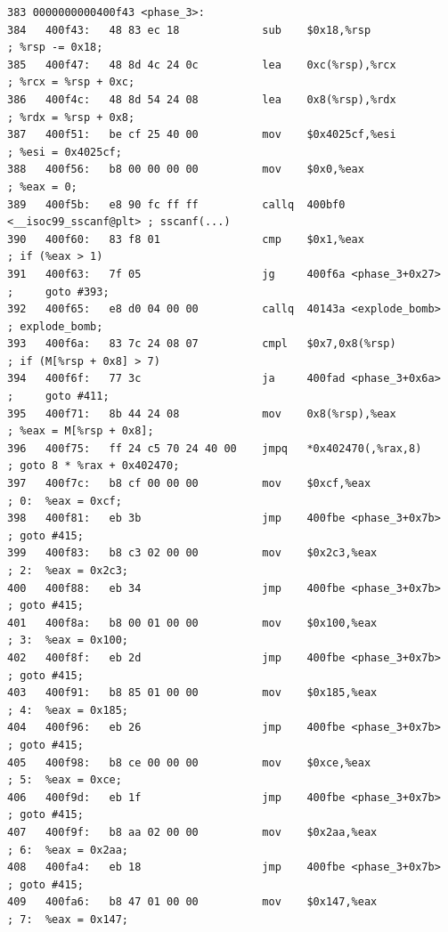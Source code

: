 \documentclass{article}
\begin{document}
\begin{lstlisting}[title = phase\_3反汇编代码及注释, xleftmargin = 2em,xrightmargin = 2em, aboveskip = 1em, numbers = none, basicstyle=\footnotesize\ttfamily]
383 0000000000400f43 <phase_3>:
384   400f43:   48 83 ec 18             sub    $0x18,%rsp                   ; %rsp -= 0x18;
385   400f47:   48 8d 4c 24 0c          lea    0xc(%rsp),%rcx               ; %rcx = %rsp + 0xc;
386   400f4c:   48 8d 54 24 08          lea    0x8(%rsp),%rdx               ; %rdx = %rsp + 0x8;
387   400f51:   be cf 25 40 00          mov    $0x4025cf,%esi               ; %esi = 0x4025cf;
388   400f56:   b8 00 00 00 00          mov    $0x0,%eax                    ; %eax = 0;
389   400f5b:   e8 90 fc ff ff          callq  400bf0 <__isoc99_sscanf@plt> ; sscanf(...)
390   400f60:   83 f8 01                cmp    $0x1,%eax                    ; if (%eax > 1)
391   400f63:   7f 05                   jg     400f6a <phase_3+0x27>        ;     goto #393;
392   400f65:   e8 d0 04 00 00          callq  40143a <explode_bomb>        ; explode_bomb;
393   400f6a:   83 7c 24 08 07          cmpl   $0x7,0x8(%rsp)               ; if (M[%rsp + 0x8] > 7)
394   400f6f:   77 3c                   ja     400fad <phase_3+0x6a>        ;     goto #411;
395   400f71:   8b 44 24 08             mov    0x8(%rsp),%eax               ; %eax = M[%rsp + 0x8];
396   400f75:   ff 24 c5 70 24 40 00    jmpq   *0x402470(,%rax,8)           ; goto 8 * %rax + 0x402470;
397   400f7c:   b8 cf 00 00 00          mov    $0xcf,%eax               ; 0:  %eax = 0xcf;
398   400f81:   eb 3b                   jmp    400fbe <phase_3+0x7b>        ; goto #415;
399   400f83:   b8 c3 02 00 00          mov    $0x2c3,%eax              ; 2:  %eax = 0x2c3;
400   400f88:   eb 34                   jmp    400fbe <phase_3+0x7b>        ; goto #415;
401   400f8a:   b8 00 01 00 00          mov    $0x100,%eax              ; 3:  %eax = 0x100;
402   400f8f:   eb 2d                   jmp    400fbe <phase_3+0x7b>        ; goto #415;
403   400f91:   b8 85 01 00 00          mov    $0x185,%eax              ; 4:  %eax = 0x185;
404   400f96:   eb 26                   jmp    400fbe <phase_3+0x7b>        ; goto #415;
405   400f98:   b8 ce 00 00 00          mov    $0xce,%eax               ; 5:  %eax = 0xce;
406   400f9d:   eb 1f                   jmp    400fbe <phase_3+0x7b>        ; goto #415;
407   400f9f:   b8 aa 02 00 00          mov    $0x2aa,%eax              ; 6:  %eax = 0x2aa;
408   400fa4:   eb 18                   jmp    400fbe <phase_3+0x7b>        ; goto #415;
409   400fa6:   b8 47 01 00 00          mov    $0x147,%eax              ; 7:  %eax = 0x147;

\end{lstlisting}
\end{document}
